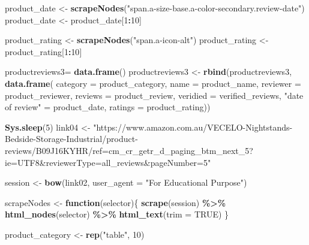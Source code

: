 \documentclass[
]{article}
\newenvironment{Shaded}{\begin{snugshade}}{\end{snugshade}}
\newcommand{\AttributeTok}[1]{\textcolor[rgb]{0.13,0.29,0.53}{#1}}
\newcommand{\ConstantTok}[1]{\textcolor[rgb]{0.56,0.35,0.01}{#1}}
\newcommand{\ControlFlowTok}[1]{\textcolor[rgb]{0.13,0.29,0.53}{\textbf{#1}}}
\newcommand{\DecValTok}[1]{\textcolor[rgb]{0.00,0.00,0.81}{#1}}
\newcommand{\FunctionTok}[1]{\textcolor[rgb]{0.13,0.29,0.53}{\textbf{#1}}}
\newcommand{\NormalTok}[1]{#1}
\newcommand{\OtherTok}[1]{\textcolor[rgb]{0.56,0.35,0.01}{#1}}
\newcommand{\SpecialCharTok}[1]{\textcolor[rgb]{0.81,0.36,0.00}{\textbf{#1}}}
\newcommand{\StringTok}[1]{\textcolor[rgb]{0.31,0.60,0.02}{#1}}
\begin{document}
\begin{Shaded}
\begin{Highlighting}[]
\NormalTok{  product\_date }\OtherTok{\textless{}{-}} \FunctionTok{scrapeNodes}\NormalTok{(}\StringTok{"span.a{-}size{-}base.a{-}color{-}secondary.review{-}date"}\NormalTok{)}
\NormalTok{  product\_date }\OtherTok{\textless{}{-}}\NormalTok{ product\_date[}\DecValTok{1}\SpecialCharTok{:}\DecValTok{10}\NormalTok{]}
  
\NormalTok{  product\_rating }\OtherTok{\textless{}{-}} \FunctionTok{scrapeNodes}\NormalTok{(}\StringTok{"span.a{-}icon{-}alt"}\NormalTok{)}
\NormalTok{  product\_rating }\OtherTok{\textless{}{-}}\NormalTok{ product\_rating[}\DecValTok{1}\SpecialCharTok{:}\DecValTok{10}\NormalTok{]}
  
\NormalTok{  productreviews3}\OtherTok{=} \FunctionTok{data.frame}\NormalTok{()}
\NormalTok{  productreviews3 }\OtherTok{\textless{}{-}} \FunctionTok{rbind}\NormalTok{(productreviews3, }\FunctionTok{data.frame}\NormalTok{(}
                      \AttributeTok{category =}\NormalTok{ product\_category,}
                      \AttributeTok{name =}\NormalTok{ product\_name,}
                      \AttributeTok{reviewer =}\NormalTok{ product\_reviewer,}
                      \AttributeTok{reviews =}\NormalTok{ product\_review,}
                      \AttributeTok{veridied =}\NormalTok{ verified\_reviews,}
                      \StringTok{"date of review"} \OtherTok{=}\NormalTok{ product\_date,}
                      \AttributeTok{ratings =}\NormalTok{ product\_rating))}
  
   \FunctionTok{Sys.sleep}\NormalTok{(}\DecValTok{5}\NormalTok{)}
\NormalTok{link04 }\OtherTok{\textless{}{-}} \StringTok{"https://www.amazon.com.au/VECELO{-}Nightstands{-}Bedside{-}Storage{-}Industrial/product{-}reviews/B09J16KYHR/ref=cm\_cr\_getr\_d\_paging\_btm\_next\_5?ie=UTF8\&reviewerType=all\_reviews\&pageNumber=5"}


\NormalTok{  session }\OtherTok{\textless{}{-}} \FunctionTok{bow}\NormalTok{(link02,}
               \AttributeTok{user\_agent =} \StringTok{"For Educational Purpose"}\NormalTok{)}

\NormalTok{  scrapeNodes }\OtherTok{\textless{}{-}} \ControlFlowTok{function}\NormalTok{(selector)\{}
    \FunctionTok{scrape}\NormalTok{(session) }\SpecialCharTok{\%\textgreater{}\%}
      \FunctionTok{html\_nodes}\NormalTok{(selector) }\SpecialCharTok{\%\textgreater{}\%}
      \FunctionTok{html\_text}\NormalTok{(}\AttributeTok{trim =} \ConstantTok{TRUE}\NormalTok{)}
\NormalTok{  \}}

\NormalTok{  product\_category }\OtherTok{\textless{}{-}} \FunctionTok{rep}\NormalTok{(}\StringTok{"table"}\NormalTok{, }\DecValTok{10}\NormalTok{)}


\end{Highlighting}
\end{Shaded}
\end{document}
